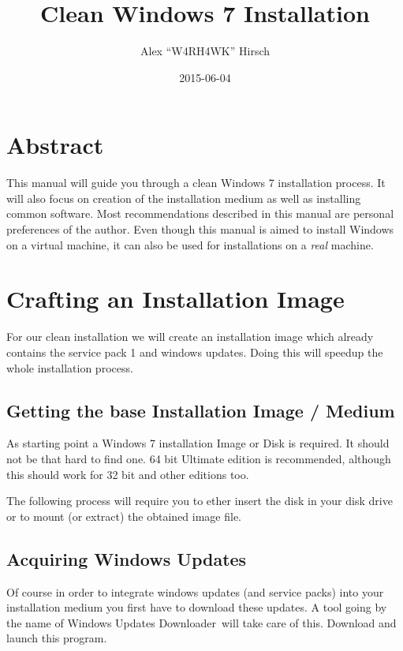 \documentclass{itsarticle}
\title{Clean Windows 7 Installation}
\author{Alex ``W4RH4WK'' Hirsch}
\date{2015-06-04}
\begin{document}
\maketitle

\section*{Abstract}
\label{sec:abstract}

This manual will guide you through a clean Windows 7 installation process. It
will also focus on creation of the installation medium as well as installing
common software. Most recommendations described in this manual are personal
preferences of the author. Even though this manual is aimed to install Windows
on a virtual machine, it can also be used for installations on a \emph{real}
machine.

\section{Crafting an Installation Image}
\label{sec:install_image}

For our clean installation we will create an installation image which already
contains the service pack 1 and windows updates. Doing this will speedup the
whole installation process.

\subsection{Getting the base Installation Image / Medium}
\label{ssec:win7_base_iso}

As starting point a Windows 7 installation Image or Disk is required. It
should not be that hard to find one. 64 bit Ultimate edition is recommended,
although this should work for 32 bit and other editions too.

The following process will require you to ether insert the disk in your disk
drive or to mount (or extract) the obtained image file.

\subsection{Acquiring Windows Updates}
\label{ssec:get_win7_updates}

Of course in order to integrate windows updates (and service packs) into your
installation medium you first have to download these updates. A tool going by
the name of Windows Updates Downloader\footnotemark\ will take care of this.
Download and launch this program.
\end{document}
